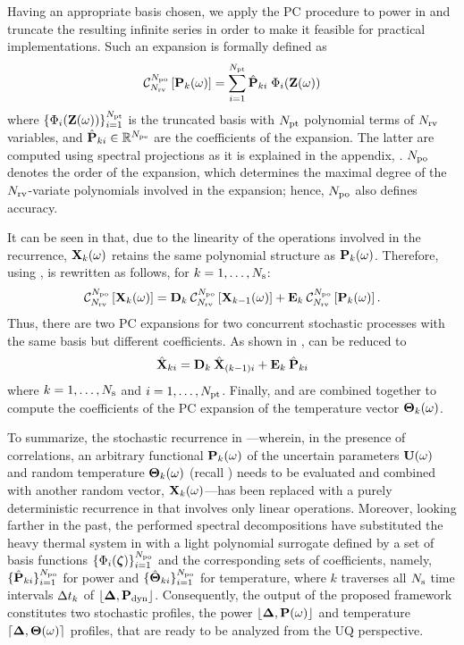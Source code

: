 Having an appropriate basis chosen, we apply the PC procedure to power in  and truncate the resulting infinite series in order to make it feasible for practical implementations. Such an expansion is formally defined as
\begin{equation} \elabel{pc-expansion}
  \oPC{\vars}{\pcorder}{\vP_k(\o)} = \sum_{i = 1}^{\pcterms} \pcc{\vP}_{ki} \; \pcb_i(\vZ(\o))
\end{equation}
where $\{ \Phi_i(\mathbf{Z}(\omega)) \}_{i = 1}^{{N_\text{pt}}}$ is the truncated basis with ${N_\text{pt}}$ polynomial terms of ${N_\text{rv}}$ variables, and $\hat{\mathbf{P}}_{ki} \in \mathbb{R}^{N_\text{pe}}$ are the coefficients of the expansion. The latter are computed using spectral projections as it is explained in the appendix, . ${N_\text{po}}$ denotes the order of the expansion, which determines the maximal degree of the ${N_\text{rv}}$-variate polynomials involved in the expansion; hence, ${N_\text{po}}$ also defines accuracy.

It can be seen in  that, due to the linearity of the operations involved in the recurrence, $\mathbf{X}_k(\omega)$ retains the same polynomial structure as $\mathbf{P}_k(\omega)$. Therefore, using ,  is rewritten as follows, for $k = 1, \dotsc, N_\text{s}$:
\begin{equation} \elabel{expanded-recurrence}
  \oPC{\vars}{\pcorder}{\vX_k(\o)} = \mCF_k \: \oPC{\vars}{\pcorder}{\vX_{k-1}(\o)} + \mCS_k \: \oPC{\vars}{\pcorder}{\vP_k(\o)}.
\end{equation}
Thus, there are two PC expansions for two concurrent stochastic processes with the same basis but different coefficients. As shown in ,  can be reduced to
\begin{equation} \elabel{pc-recurrence}
  \pcc{\vX}_{ki} = \mCF_k \: \pcc{\vX}_{(k - 1)i} + \mCS_k \: \pcc{\vP}_{ki}
\end{equation}
where $k = 1, \dotsc, N_\text{s}$ and $i = 1, \dotsc, {N_\text{pt}}$. Finally,  and  are combined together to compute the coefficients of the PC expansion of the temperature vector ${\boldsymbol\Theta}_k(\omega)$.

To summarize, the stochastic recurrence in ---wherein, in the presence of correlations, an arbitrary functional $\mathbf{P}_k(\omega)$ of the uncertain parameters $\mathbf{U}(\omega)$ and random temperature ${\boldsymbol\Theta}_k(\omega)$ (recall ) needs to be evaluated and combined with another random vector, $\mathbf{X}_k(\omega)$---has been replaced with a purely deterministic recurrence in  that involves only linear operations. Moreover, looking farther in the past, the performed spectral decompositions have substituted the heavy thermal system in  with a light polynomial surrogate defined by a set of basis functions $\{ \Phi_i(\boldsymbol{\zeta}) \}_{i = 1}^{{N_\text{po}}}$ and the corresponding sets of coefficients, namely, $\{ \hat{\mathbf{P}}_{ki} \}_{i = 1}^{{N_\text{po}}}$ for power and $\{ \hat{{\boldsymbol\Theta}}_{ki} \}_{i = 1}^{{N_\text{po}}}$ for temperature, where $k$ traverses all $N_\text{s}$ time intervals $\Delta t_k$ of $\profPdyn$. Consequently, the output of the proposed framework constitutes two stochastic profiles, the power $\profP{\o}$ and temperature $\profT{\o}$ profiles, that are ready to be analyzed from the UQ perspective.
